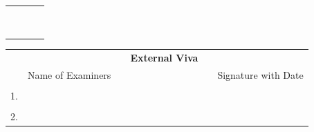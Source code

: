 \ifIDP
\begin{table}[H]
\centering
\begin{tabular}{p{}p{}p{}c}
	&&&\\
	&&&\\
	\centering{\printGuideNameA}&\\
	\centering{Guide \& Head of the Department} &
	& & &\\
	& & & \\
	& & & \\
	\centering{\printDA} &  & \centering{\printPrincipal} &\\
	\centering{Dean Academics} & & \centering{Principal} &\\
	&&&\\
\end{tabular}%
\end{table}
\else
\vspace{1cm}
\begin{table}[H]
\centering
{}
\end{table}
\fi %
\ifStuNameCUsed \vspace{-0.75cm}\fi
\begin{table}[H]
\centering
\begin{tabular}{lccp{6cm}cc}
	&&&\textbf{\Large External Viva}&&\\
	
	&Name of Examiners &&& & Signature with Date\\
	&&&&&\\
	1.&&&&&\\
	&&&&&\\
	2.&&&&&\\
\end{tabular}%
\end{table}
